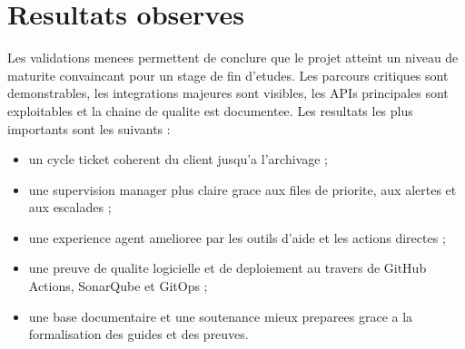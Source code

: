 \section{Resultats observes}

Les validations menees permettent de conclure que le projet atteint un niveau de maturite convaincant pour un stage de fin d'etudes. Les parcours critiques sont demonstrables, les integrations majeures sont visibles, les APIs principales sont exploitables et la chaine de qualite est documentee. Les resultats les plus importants sont les suivants :

\begin{itemize}[leftmargin=1.2cm]
  \item un cycle ticket coherent du client jusqu'a l'archivage ;
  \item une supervision manager plus claire grace aux files de priorite, aux alertes et aux escalades ;
  \item une experience agent amelioree par les outils d'aide et les actions directes ;
  \item une preuve de qualite logicielle et de deploiement au travers de GitHub Actions, SonarQube et GitOps ;
  \item une base documentaire et une soutenance mieux preparees grace a la formalisation des guides et des preuves.
\end{itemize}


